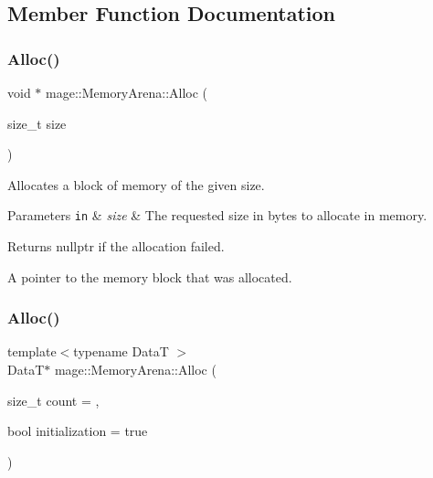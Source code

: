 \subsection{Member Function Documentation}
\hypertarget{classmage_1_1_memory_arena_a2e63b11c535dbfefd69d071466be9ce1}{}\label{classmage_1_1_memory_arena_a2e63b11c535dbfefd69d071466be9ce1} 
\subsubsection{\texorpdfstring{Alloc()}{Alloc()}\hspace{0.1cm}{\footnotesize\ttfamily [1/2]}}
{\footnotesize\ttfamily void $\ast$ mage\+::\+Memory\+Arena\+::\+Alloc (\begin{DoxyParamCaption}\item[{size\+\_\+t}]{size }\end{DoxyParamCaption})}

Allocates a block of memory of the given size.


\begin{DoxyParams}[1]{Parameters}
\mbox{\tt in}  & {\em size} & The requested size in bytes to allocate in memory. \\
\hline
\end{DoxyParams}
\begin{DoxyReturn}{Returns}
{\ttfamily nullptr} if the allocation failed. 

A pointer to the memory block that was allocated. 
\end{DoxyReturn}
\hypertarget{classmage_1_1_memory_arena_a6797843db400848170d0b448a8a7e3b5}{}\label{classmage_1_1_memory_arena_a6797843db400848170d0b448a8a7e3b5} 
\subsubsection{\texorpdfstring{Alloc()}{Alloc()}\hspace{0.1cm}{\footnotesize\ttfamily [2/2]}}
{\footnotesize\ttfamily template$<$typename DataT $>$ \\
DataT$\ast$ mage\+::\+Memory\+Arena\+::\+Alloc (\begin{DoxyParamCaption}\item[{size\+\_\+t}]{count = {},  }\item[{bool}]{initialization = {\ttfamily true} }\end{DoxyParamCaption})}

